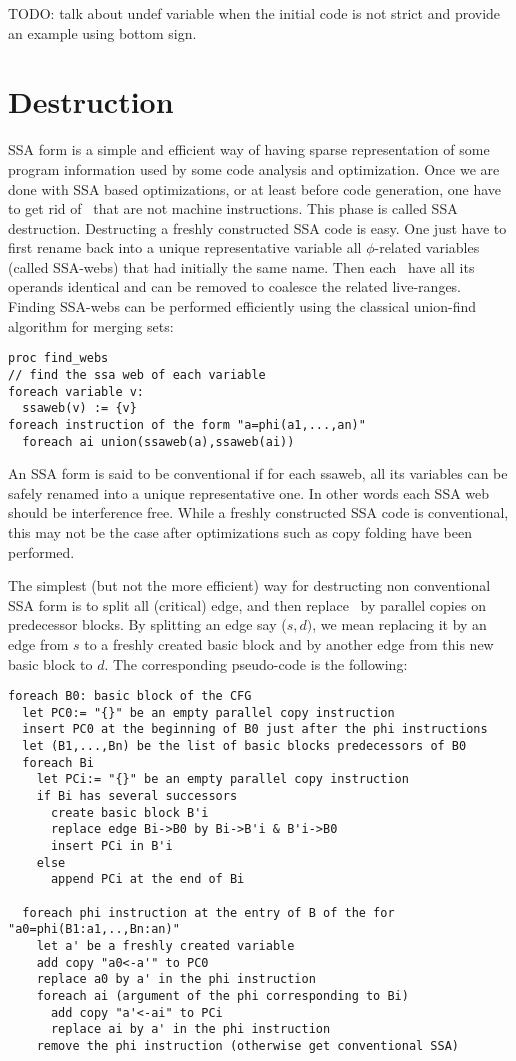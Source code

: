 TODO: talk about undef variable when the initial code is not strict and provide an example using bottom sign.


\section{Destruction }
\label{sec:classical_destruction}

SSA form is a simple and efficient way of having sparse representation of some program information used by some code analysis and optimization. Once we are done with SSA based optimizations, or at least before code generation, one have to get rid of \phiops\ that are not machine instructions. This phase is called SSA destruction. 
Destructing a freshly constructed SSA code is easy. One just have to first rename back into a unique representative variable all $\phi$-related variables (called SSA-webs) that had initially the same name. Then each \phiop\ have all its operands identical and can be removed to coalesce the related live-ranges.
Finding SSA-webs can be performed efficiently using the classical union-find algorithm for merging sets:
\begin{verbatim}
proc find_webs
// find the ssa web of each variable
foreach variable v:
  ssaweb(v) := {v}
foreach instruction of the form "a=phi(a1,...,an)"
  foreach ai union(ssaweb(a),ssaweb(ai))
\end{verbatim}

An SSA form is said to be conventional if for each ssaweb, all its variables can be safely renamed into a unique representative one. In other words each SSA web should be interference free. While a freshly constructed SSA code is conventional, this may not be the case after optimizations such as copy folding have been performed.

The simplest (but not the more efficient) way for destructing non conventional SSA form is to split all (critical) edge, and then replace \phiops\ by parallel copies on predecessor blocks. By splitting an edge say ($s,d)$, we mean replacing it by an edge from $s$ to a freshly created basic block and by another edge from this new basic block to $d$. The corresponding pseudo-code is the following:

\begin{verbatim}
foreach B0: basic block of the CFG
  let PC0:= "{}" be an empty parallel copy instruction
  insert PC0 at the beginning of B0 just after the phi instructions
  let (B1,...,Bn) be the list of basic blocks predecessors of B0
  foreach Bi
    let PCi:= "{}" be an empty parallel copy instruction
    if Bi has several successors
      create basic block B'i
      replace edge Bi->B0 by Bi->B'i & B'i->B0
      insert PCi in B'i
    else
      append PCi at the end of Bi
    
  foreach phi instruction at the entry of B of the for "a0=phi(B1:a1,..,Bn:an)"
    let a' be a freshly created variable
    add copy "a0<-a'" to PC0
    replace a0 by a' in the phi instruction
    foreach ai (argument of the phi corresponding to Bi)
      add copy "a'<-ai" to PCi
      replace ai by a' in the phi instruction
    remove the phi instruction (otherwise get conventional SSA)
\end{verbatim}


